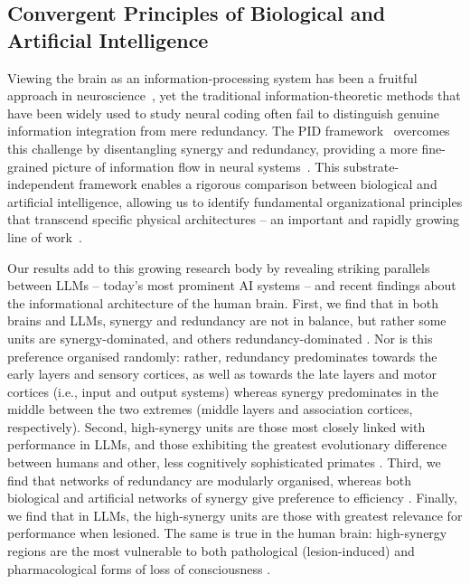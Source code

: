 \documentclass[11pt,a4paper]{ouparticle}
\begin{document}
\subsection*{Convergent Principles of Biological and Artificial Intelligence }

Viewing the brain as an information-processing system has been a fruitful approach in neuroscience~\cite{quian2009extracting, amico2021toward, panzeri2022structures, luppi2024information}, yet the traditional information-theoretic methods that have been widely used to study neural coding often fail to distinguish genuine information integration from mere redundancy. The PID framework~\cite{pid2010beer} overcomes this challenge by disentangling synergy and redundancy, providing a more fine-grained picture of information flow in neural systems~\cite{luppi2024information}. This substrate-independent framework enables a rigorous comparison between biological and artificial intelligence, allowing us to identify fundamental organizational principles that transcend specific physical architectures -- an important and rapidly growing line of work~\cite{Tax2017,ehrlich2023complexity,makkeh2025general}.

Our results add to this growing research body by revealing striking parallels between LLMs -- today's most prominent AI systems -- and recent findings about the informational architecture of the human brain. First, we find that in both brains and LLMs, synergy and redundancy are not in balance, but rather some units are synergy-dominated, and others redundancy-dominated \cite{luppi2022synergistic, varley2023}. Nor is this preference organised randomly: rather, redundancy predominates towards the early layers and sensory cortices, as well as towards the late layers and motor cortices (i.e., input and output systems) whereas synergy predominates in the middle between the two extremes (middle layers and association cortices, respectively). Second, high-synergy units are those most closely linked with performance in LLMs, and those exhibiting the greatest evolutionary difference between humans and other, less cognitively sophisticated primates \cite{luppi2022synergistic}. Third, we find that networks of redundancy are modularly organised, whereas both biological and artificial networks of synergy give preference to efficiency \cite{luppi2022synergistic}. Finally, we find that in LLMs, the high-synergy units are those with greatest relevance for performance when lesioned. The same is true in the human brain: high-synergy regions are the most vulnerable to both pathological (lesion-induced) and pharmacological forms of loss of consciousness \cite{luppi2024workspace}. 
\end{document}

